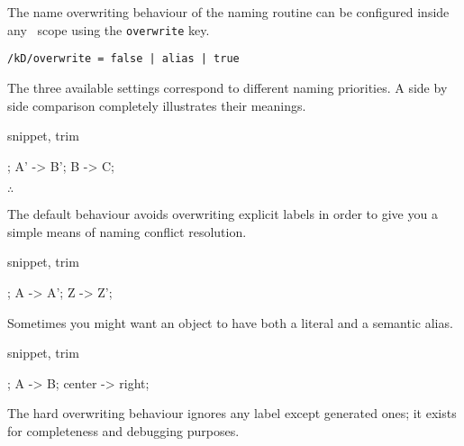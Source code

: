 The name overwriting behaviour of the naming routine can be configured
inside any \koDi\ scope using the \lstinline!overwrite! key.

\begin{lstlisting}
/kD/overwrite = false | alias | true
\end{lstlisting}

The three available settings correspond to different naming priorities.
A side by side comparison completely illustrates their meanings.

\begin{tcblisting}{snippet, trim}
\begin{kodi}
; %
\mor A' -> B';
\mor B  -> C;
\end{kodi}
\end{tcblisting}

\hfill$\therefore$\hfill\null

The default behaviour avoids overwriting explicit labels in order
to give you a simple means of naming conflict resolution.

\begin{tcblisting}{snippet, trim}
\begin{kodi}[tetragonal]
;
\mor A -> A';
\mor Z -> Z';
\end{kodi}
\end{tcblisting}

Sometimes you might want an object to have both a literal and a
semantic alias.

\begin{tcblisting}{snippet, trim}
\begin{kodi}
;
\mor A -> B;
\mor center -> right;
\end{kodi}
\end{tcblisting}

The hard overwriting behaviour ignores any label except generated
ones; it exists for completeness and debugging purposes.
